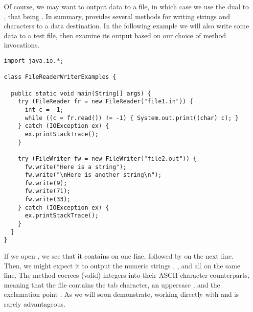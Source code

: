 Of course, we may want to output data to a file, in which case we use the dual to , that being . 
In summary,  provides several methods for writing strings and characters to a data destination. 
In the following example we will also write some data to a test file, then examine its output based on our choice of method invocations.

\begin{lstlisting}[language=MyJava]
import java.io.*;

class FileReaderWriterExamples {

  public static void main(String[] args) {
    try (FileReader fr = new FileReader("file1.in")) {
      int c = -1; 
      while ((c = fr.read()) != -1) { System.out.print((char) c); }
    } catch (IOException ex) {
      ex.printStackTrace();
    }

    try (FileWriter fw = new FileWriter("file2.out")) {
      fw.write("Here is a string");
      fw.write("\nHere is another string\n"); 
      fw.write(9);
      fw.write(71);
      fw.write(33);
    } catch (IOException ex) {
      ex.printStackTrace();
    }
  }
}

\end{lstlisting}

If we open , we see that it contains  on one line, followed by  on the next line. 
Then, we might expect it to output the numeric strings , , and  all on the same line. 
The  method coerces (valid) integers into their ASCII character counterparts, meaning that the file contains the tab character, an uppercase , and the exclamation point . 
As we will soon demonstrate, working directly with  and  is rarely advantageous. 

